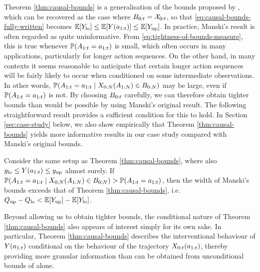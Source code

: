Theorem \ref{thm:causal-bounds} is a generalisation of the bounds proposed by \cite{manski}, which can be recovered as the case where $B_{0:t} = \mathcal{X}_{0:t}$, so that \eqref{eq:causal-bounds-fully-written} becomes $\mathbb{E}[Y_{\mathrm{lo}}] \leq \mathbb{E}[Y(a_{1:t})] \leq \mathbb{E}[Y_{\mathrm{up}}]$.
In practice, Manski's result is often regarded as quite uninformative.
From \eqref{eq:tightness-of-bounds-measure}, this is true whenever $\mathbb{P}(A_{1:t} = a_{1:t})$ is small, which often occurs in many applications, particularly for longer action sequences.
On the other hand, in many contexts it seems reasonable to anticipate that certain longer action sequences will be fairly likely to occur when conditioned on some intermediate observations.
In other words, $\mathbb{P}(A_{1:t} = a_{1:t} \mid X_{0:N}(A_{1:N}) \in B_{0:N})$ may be large, even if $\mathbb{P}(A_{1:t} = a_{1:t})$ is not.
By choosing $B_{0:t}$ carefully, we can therefore obtain tighter bounds than would be possible by using Manski's original result.
The following straightforward result provides a sufficient condition for this to hold.
In Section \ref{sec:case-study} below, we also show empirically that Theorem \ref{thm:causal-bounds} yields more informative results in our case study compared with Manski's original bounds.




\begin{proposition} \label{prop:our-bounds-vs-manskis}
    Consider the same setup as Theorem \ref{thm:causal-bounds}, where also $y_{\mathrm{lo}} \leq Y(a_{1:t}) \leq y_{\mathrm{up}}$ almost surely.
    If $\mathbb{P}(A_{1:t} = a_{1:t} \mid X_{0:N}(A_{1:N}) \in B_{0:N}) > \mathbb{P}(A_{1:t} = a_{1:t})$, then the width of Manski's bounds exceeds that of Theorem \ref{thm:causal-bounds}, i.e.\ $Q_{\mathrm{up}} - Q_{\mathrm{lo}} < \mathbb{E}[Y_{\mathrm{up}}] - \mathbb{E}[Y_{\mathrm{lo}}]$.
\end{proposition}

Beyond allowing us to obtain tighter bounds, the conditional nature of Theorem \ref{thm:causal-bounds} also appears of interest simply for its own sake.
In particular, Theorem \ref{thm:causal-bounds} describes the interventional behaviour of $Y(a_{1:t})$ conditional on the behaviour of the trajectory $X_{0:t}(a_{1:t})$, thereby providing more granular information than can be obtained from unconditional bounds of \cite{manski} alone.

